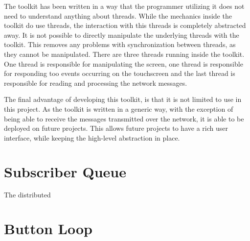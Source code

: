 The toolkit has been written in a way that the programmer utilizing it does not need to understand anything about threads. While the mechanics inside the toolkit do use threads, the interaction with this threads is completely abstracted away. It is not possible to directly manipulate the underlying threads with the toolkit. This removes any problems with synchronization between threads, as they cannot be manipulated. There are three threads running inside the toolkit. One thread is responsible for manipulating the screen, one thread is responsible for responding too events occurring on the touchscreen  and the last thread is responsible for reading and processing the network messages.

The final advantage of developing this toolkit, is that it is not limited to use in this project. As the toolkit is written in a generic way, with the exception of being able to receive the messages transmitted over the network, it is able to be deployed on future projects. This allows future projects to have a rich user interface, while keeping the high-level abstraction in place.





\section{Subscriber Queue}

The distributed 


\section{Button Loop}



%
%
%
%
%
%







